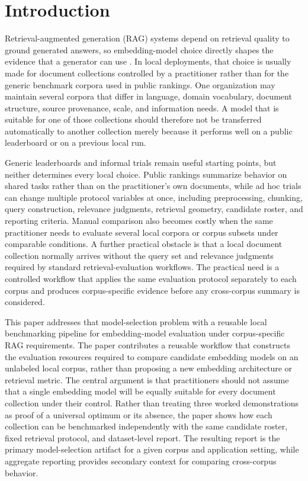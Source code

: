 \section{Introduction}\label{introduction}

Retrieval-augmented generation (RAG) systems depend on retrieval quality to ground generated answers, so embedding-model choice directly shapes the evidence that a generator can use \citep{Lewis_RAG_2021}. In local deployments, that choice is usually made for document collections controlled by a practitioner rather than for the generic benchmark corpora used in public rankings. One organization may maintain several corpora that differ in language, domain vocabulary, document structure, source provenance, scale, and information needs. A model that is suitable for one of those collections should therefore not be transferred automatically to another collection merely because it performs well on a public leaderboard or on a previous local run.

Generic leaderboards and informal trials remain useful starting points, but neither determines every local choice. Public rankings summarize behavior on shared tasks rather than on the practitioner's own documents, while ad hoc trials can change multiple protocol variables at once, including preprocessing, chunking, query construction, relevance judgments, retrieval geometry, candidate roster, and reporting criteria. Manual comparison also becomes costly when the same practitioner needs to evaluate several local corpora or corpus subsets under comparable conditions. A further practical obstacle is that a local document collection normally arrives without the query set and relevance judgments required by standard retrieval-evaluation workflows. The practical need is a controlled workflow that applies the same evaluation protocol separately to each corpus and produces corpus-specific evidence before any cross-corpus summary is considered.

This paper addresses that model-selection problem with a reusable local benchmarking pipeline for embedding-model evaluation under corpus-specific RAG requirements. The paper contributes a reusable workflow that constructs the evaluation resources required to compare candidate embedding models on an unlabeled local corpus, rather than proposing a new embedding architecture or retrieval metric. The central argument is that practitioners should not assume that a single embedding model will be equally suitable for every document collection under their control. Rather than treating three worked demonstrations as proof of a universal optimum or its absence, the paper shows how each collection can be benchmarked independently with the same candidate roster, fixed retrieval protocol, and dataset-level report. The resulting report is the primary model-selection artifact for a given corpus and application setting, while aggregate reporting provides secondary context for comparing cross-corpus behavior.


